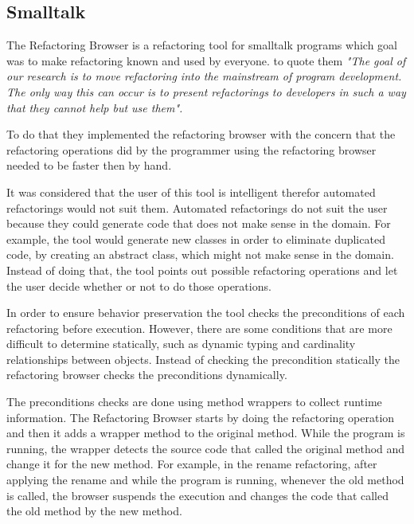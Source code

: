 





\subsection{Smalltalk}%

The Refactoring Browser \cite{roberts1997refactoring} is a refactoring tool for smalltalk programs which goal was to make refactoring known and used by everyone.
to quote them  \textit{"The goal of our research is to move refactoring into the mainstream of program development. The only way this can occur is to present refactorings to developers in such a way that they cannot help but use them".} 

To do that they implemented the refactoring browser with the concern that the refactoring operations did by the programmer using the refactoring browser needed to be faster then by hand.

It was considered that the user of this tool is intelligent therefor automated refactorings would not suit them. 
Automated refactorings do not suit the user because they could generate code that does not make sense in the domain.
For example, the tool would generate new classes in order to eliminate duplicated code, by creating an abstract class, which might not make sense in the domain. Instead of doing that, the tool points out possible refactoring operations and let the user decide whether or not to do those operations.

In order to ensure behavior preservation the tool checks the preconditions of each refactoring before execution. 
However, there are some conditions that are more difficult to determine statically, such as dynamic typing and cardinality relationships between objects. 
Instead of checking the precondition statically the refactoring browser checks the preconditions dynamically. 

The preconditions checks are done using method wrappers to collect runtime information. 
The Refactoring Browser starts by doing the refactoring operation and then it adds a wrapper method to the original method. 
While the program is running, the wrapper detects the source code that called the original method and change it for the new method.
For example, in the rename refactoring, after applying the rename and while the program is running, whenever the old method is called, the browser suspends the execution and changes the code that called the old method by the new method. 

